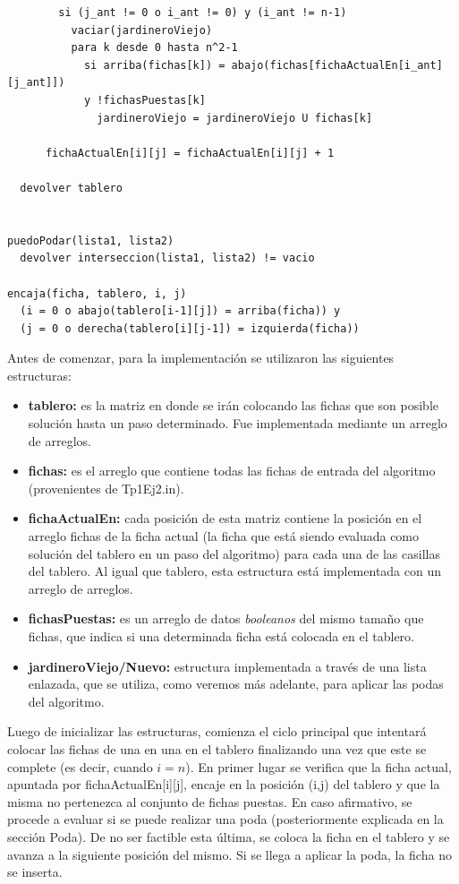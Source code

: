 \documentclass[a4paper,10pt] {article}
\begin{document}
\begin{verbatim}
        si (j_ant != 0 o i_ant != 0) y (i_ant != n-1)
          vaciar(jardineroViejo)
          para k desde 0 hasta n^2-1
            si arriba(fichas[k]) = abajo(fichas[fichaActualEn[i_ant][j_ant]]) 
            y !fichasPuestas[k]
              jardineroViejo = jardineroViejo U fichas[k]

      fichaActualEn[i][j] = fichaActualEn[i][j] + 1

  devolver tablero


puedoPodar(lista1, lista2)
  devolver interseccion(lista1, lista2) != vacio

encaja(ficha, tablero, i, j)
  (i = 0 o abajo(tablero[i-1][j]) = arriba(ficha)) y
  (j = 0 o derecha(tablero[i][j-1]) = izquierda(ficha))

\end{verbatim}

Antes de comenzar, para la implementaci\'on se utilizaron las siguientes estructuras:
\begin{itemize}
 \item \textbf{tablero:} es la matriz en donde se ir\'an colocando las fichas que son posible soluci\'on hasta un paso determinado. Fue implementada mediante un arreglo de arreglos.
\item \textbf{fichas:} es el arreglo que contiene todas las fichas de entrada del algoritmo (provenientes de Tp1Ej2.in).
\item \textbf{fichaActualEn:} cada posici\'on de esta matriz contiene la posici\'on en el arreglo fichas de la ficha actual (la ficha que est\'a siendo evaluada como soluci\'on del tablero en un paso del algoritmo) para cada una de las casillas del tablero. Al igual que tablero, esta estructura est\'a implementada con un arreglo de arreglos.
\item \textbf{fichasPuestas:} es un arreglo de datos \textit{booleanos} del mismo tama\~{n}o que fichas, que indica si una determinada ficha est\'a colocada en el tablero.
\item \textbf{jardineroViejo/Nuevo:} estructura implementada a trav\'es de una lista enlazada, que se utiliza, como veremos m\'as adelante, para aplicar las podas del algoritmo.
\end{itemize}

Luego de inicializar las estructuras, comienza el ciclo principal que intentar\'a colocar las fichas de una en una en el tablero finalizando una vez que este se complete (es decir, cuando $i = n$). En primer lugar se verifica que la ficha actual, apuntada por fichaActualEn[i][j], encaje en la posici\'on (i,j) del tablero y que la misma no pertenezca al conjunto de fichas puestas. En caso afirmativo, se procede a evaluar si se puede realizar una poda (posteriormente explicada en la secci\'on Poda). De no ser factible esta \'ultima, se coloca la ficha en el tablero y se avanza a la siguiente posici\'on del mismo. Si se llega a aplicar la poda, la ficha no se inserta.
\end{document}
